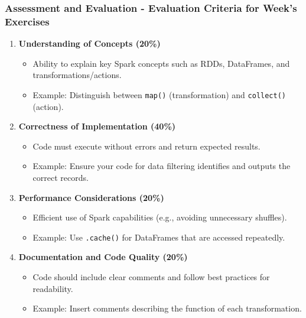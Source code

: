 \documentclass[aspectratio=169]{beamer}
\begin{document}
\begin{frame}[fragile]
    \frametitle{Assessment and Evaluation - Evaluation Criteria for Week's Exercises}
    \begin{enumerate}
        \item \textbf{Understanding of Concepts (20\%)}
            \begin{itemize}
                \item Ability to explain key Spark concepts such as RDDs, DataFrames, and transformations/actions.
                \item Example: Distinguish between \texttt{map()} (transformation) and \texttt{collect()} (action).
            \end{itemize}
        \item \textbf{Correctness of Implementation (40\%)} 
            \begin{itemize}
                \item Code must execute without errors and return expected results.
                \item Example: Ensure your code for data filtering identifies and outputs the correct records.
            \end{itemize}
        \item \textbf{Performance Considerations (20\%)} 
            \begin{itemize}
                \item Efficient use of Spark capabilities (e.g., avoiding unnecessary shuffles).
                \item Example: Use \texttt{.cache()} for DataFrames that are accessed repeatedly.
            \end{itemize}
        \item \textbf{Documentation and Code Quality (20\%)} 
            \begin{itemize}
                \item Code should include clear comments and follow best practices for readability.
                \item Example: Insert comments describing the function of each transformation.
            \end{itemize}
    \end{enumerate}
\end{frame}
\end{document}
